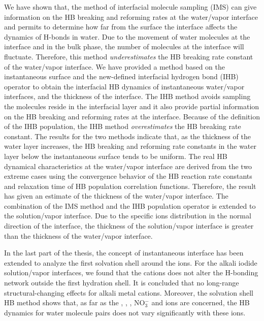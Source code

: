 We have shown that,
the method of interfacial molecule sampling (IMS) can give information on the HB breaking and reforming
rates at the water/vapor interface and permits to determine how far from the surface the interface affects the dynamics of H-bonds in water. 
Due to the movement of water molecules at the interface and in the bulk phase, the number of molecules at the interface will fluctuate.
Therefore, this method \emph{underestimates} the HB breaking rate constant of the water/vapor interface. 
We have provided a method based on the {instantaneous} surface and the new-defined
interfacial hydrogen bond (IHB) operator to obtain the interfacial HB dynamics of instantaneous water/vapor interfaces, and the thickness of the interface.  
The IHB method avoids sampling the molecules reside in the interfacial layer and
it also provide partial information on the HB breaking and reforming rates at the interface. 
Because of the definition of the IHB population, the IHB method \emph{overestimates} the HB breaking rate constant. 
The results for the two methods indicate that,
as the thickness of the water layer increases,
the HB breaking and reforming rate constants in the water layer {below} the instantaneous surface tends to be uniform. 
The real HB dynamical characteristics at the water/vapor interface 
are derived from the two extreme cases using the convergence behavior of the HB reaction rate constants and relaxation time 
of HB population correlation functions. 
Therefore, the result has given an estimate of the thickness of the water/vapor interface.  
The combination of the IMS method and the IHB population operator is extended to the solution/vapor interface. 
Due to the specific ions distribution in the normal direction of the interface,
the thickness of the solution/vapor interface is greater than the thickness of the water/vapor interface. 

In the last part of the thesis, the concept of instantaneous interface has been extended to analyze the first solvation shell around the ions.
For the alkali iodide solution/vapor interfaces, we found 
that the cations does not alter the H-bonding network outside the first hydration shell. 
It is concluded that no long-range structural-changing effects for alkali metal cations.
Moreover, the solvation shell HB method shows that, 
as far as the \Li, \Na, \K, NO$^-_3$ and \I ions are concerned, 
the HB dynamics for water molecule pairs does not vary significantly with these ions.

